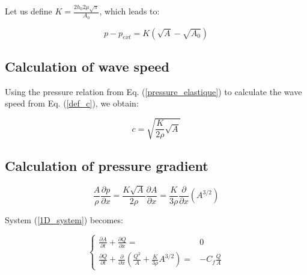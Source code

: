 \documentclass{config}
\begin{document}
Let us define $ \displaystyle K =  \frac{2 h_0 2 \mu \sqrt{\pi}}{A_0}$, which leads to:

\begin{equation}\label{pressure_elastique}
p- p_{ext} = K \left( \sqrt{A}- \sqrt{A_0}\right)
\end{equation}

\subsection{Calculation of wave speed}

Using the pressure relation from Eq. (\ref{pressure_elastique}) to calculate the wave speed from Eq. (\ref{def_c}), we obtain:
 
 \begin{equation}\label{c_elastique}
 c = \sqrt{ \frac{K}{2 \rho}\sqrt{A}}
 \end{equation}
 
\subsection{Calculation of pressure gradient}

\begin{equation}
\displaystyle \frac{A}{\rho} \frac{\partial p}{\partial x} = \frac{K \sqrt{A}}{2 \rho}\frac{\partial{A}}{\partial{x}}  = \frac{K}{3 \rho} \frac{\partial}{\partial x} \left( A^{3/2} \right) 
\end{equation} 

 
 System (\ref{1D_system}) becomes: 
 
\begin{equation}\left\{
\begin{array}{rl}
\displaystyle \frac{\partial A}{\partial t} + \frac{\partial Q}{\partial x} = & \displaystyle  0 \\
\displaystyle \frac{\partial Q}{\partial t} + \frac{\partial }{\partial x} \left( \frac{Q^2}{A} + \frac{K}{3\rho} A^{3/2} \right) = & \displaystyle - C_f \frac{Q}{A} 
\end{array}\right.
\end{equation} 
\end{document}
